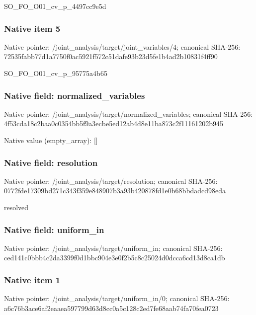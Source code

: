 \documentclass[10pt,a4paper]{article}
\begin{document}
\begingroup\raggedright\sloppy SO\_\allowbreak{}FO\_\allowbreak{}O01\_\allowbreak{}cv\_\allowbreak{}p\_\allowbreak{}4497cc9e5d\par\endgroup

\subsubsection{Native item 5}
Native pointer: /joint\_\allowbreak{}analysis/target/joint\_\allowbreak{}variables/4; canonical SHA-256: 72535fabb77d1a7750f0ac5921f572c51dafe93b23d5fe1b4ad2b10831f4ff90

\begingroup\raggedright\sloppy SO\_\allowbreak{}FO\_\allowbreak{}O01\_\allowbreak{}cv\_\allowbreak{}p\_\allowbreak{}95775a4b65\par\endgroup

\subsubsection{Native field: normalized\_\allowbreak{}variables}
Native pointer: /joint\_\allowbreak{}analysis/target/normalized\_\allowbreak{}variables; canonical SHA-256: 4f53cda18c2baa0c0354bb5f9a3ecbe5ed12ab4d8e11ba873c2f11161202b945

Native value (empty\_\allowbreak{}array): []

\subsubsection{Native field: resolution}
Native pointer: /joint\_\allowbreak{}analysis/target/resolution; canonical SHA-256: 0772fde17309bd271c343f359e848907b3a93b420878fd1e0b68bbdadcd98eda

\begingroup\raggedright\sloppy resolved\par\endgroup

\subsubsection{Native field: uniform\_\allowbreak{}in}
Native pointer: /joint\_\allowbreak{}analysis/target/uniform\_\allowbreak{}in; canonical SHA-256: ced141c0bbb4c2da3399f0d1bbc904e3e0f2b5c8c25024d0dcca6cd13d8ca1db

\subsubsection{Native item 1}
Native pointer: /joint\_\allowbreak{}analysis/target/uniform\_\allowbreak{}in/0; canonical SHA-256: a6c76b3ace6af2eaaea597799d63d8cc0a5c128c2ed7fe68aab74fa70fea0723
\end{document}
